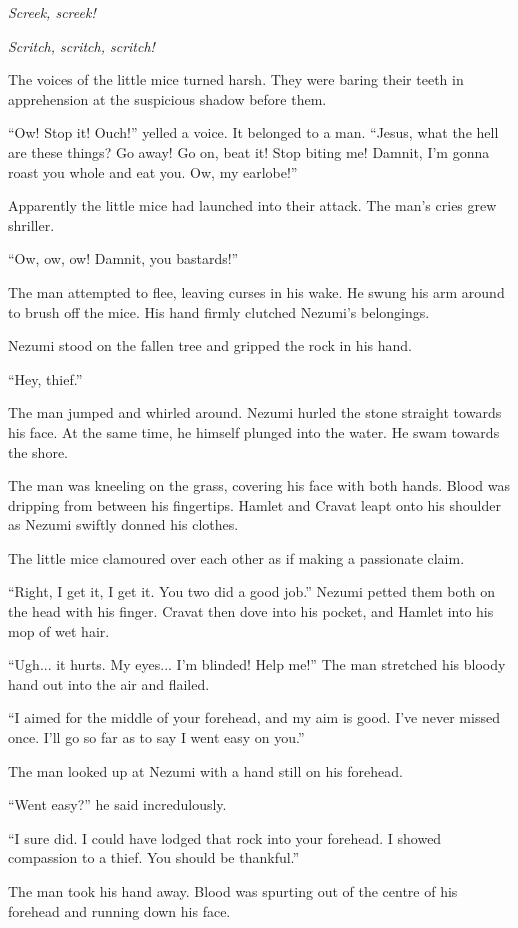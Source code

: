 \emph{Screek, screek!}

\emph{Scritch, scritch, scritch!}

The voices of the little mice turned harsh. They were baring their teeth
in apprehension at the suspicious shadow before them.

``Ow! Stop it! Ouch!'' yelled a voice. It belonged to a man. ``Jesus,
what the hell are these things? Go away! Go on, beat it! Stop biting me!
Damnit, I'm gonna roast you whole and eat you. Ow, my earlobe!''

Apparently the little mice had launched into their attack. The man's
cries grew shriller.

``Ow, ow, ow! Damnit, you bastards!''

The man attempted to flee, leaving curses in his wake. He swung his arm
around to brush off the mice. His hand firmly clutched Nezumi's
belongings.

Nezumi stood on the fallen tree and gripped the rock in his hand.

``Hey, thief.''

The man jumped and whirled around. Nezumi hurled the stone straight
towards his face. At the same time, he himself plunged into the water.
He swam towards the shore.

The man was kneeling on the grass, covering his face with both hands.
Blood was dripping from between his fingertips. Hamlet and Cravat leapt
onto his shoulder as Nezumi swiftly donned his clothes.

The little mice clamoured over each other as if making a passionate
claim.

``Right, I get it, I get it. You two did a good job.'' Nezumi petted
them both on the head with his finger. Cravat then dove into his pocket,
and Hamlet into his mop of wet hair.

``Ugh... it hurts. My eyes... I'm blinded! Help me!'' The man stretched
his bloody hand out into the air and flailed.

``I aimed for the middle of your forehead, and my aim is good. I've
never missed once. I'll go so far as to say I went easy on you.''

The man looked up at Nezumi with a hand still on his forehead.

``Went easy?'' he said incredulously.

``I sure did. I could have lodged that rock into your forehead. I showed
compassion to a thief. You should be thankful.''

The man took his hand away. Blood was spurting out of the centre of his
forehead and running down his face.

